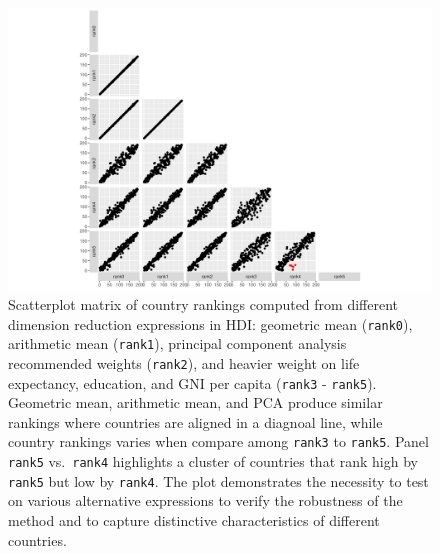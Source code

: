 \documentclass[
]{article}
\begin{document}
\begin{figure}

{\centering \includegraphics{paper_files/figure-pdf/fig-hdi-expr-1.pdf}

}

\caption{\label{fig-hdi-expr}Scatterplot matrix of country rankings
computed from different dimension reduction expressions in HDI:
geometric mean (\texttt{rank0}), arithmetic mean (\texttt{rank1}),
principal component analysis recommended weights (\texttt{rank2}), and
heavier weight on life expectancy, education, and GNI per capita
(\texttt{rank3} - \texttt{rank5}). Geometric mean, arithmetic mean, and
PCA produce similar rankings where countries are aligned in a diagnoal
line, while country rankings varies when compare among \texttt{rank3} to
\texttt{rank5}. Panel \texttt{rank5} vs.~\texttt{rank4} highlights a
cluster of countries that rank high by \texttt{rank5} but low by
\texttt{rank4}. The plot demonstrates the necessity to test on various
alternative expressions to verify the robustness of the method and to
capture distinctive characteristics of different countries.}

\end{figure}
\end{document}

